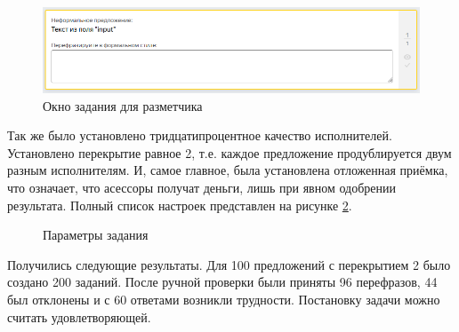 \begin{figure}[ht]
  \centering
  \includegraphics[width=\textwidth]{figures/toloka_input_field.png}
  \caption{Окно задания для разметчика}
  \label{fig:toloka_input_field}
\end{figure}

Так же было установлено тридцатипроцентное качество исполнителей. Установлено перекрытие равное 2, т.е. каждое предложение продублируется двум разным исполнителям.
И, самое главное, была установлена отложенная приёмка, что означает, что асессоры получат деньги, лишь при явном одобрении результата.
Полный список настроек представлен на рисунке \ref{fig:toloka_settings}.

\begin{figure}[ht]
  \centering
  \caption{Параметры задания}
  \label{fig:toloka_settings}
\end{figure}

Получились следующие результаты. Для 100 предложений с перекрытием 2 было создано 200 заданий. После ручной проверки были приняты 96 перефразов, 44 был отклонены и с 60 ответами возникли трудности. Постановку задачи можно считать удовлетворяющей.

